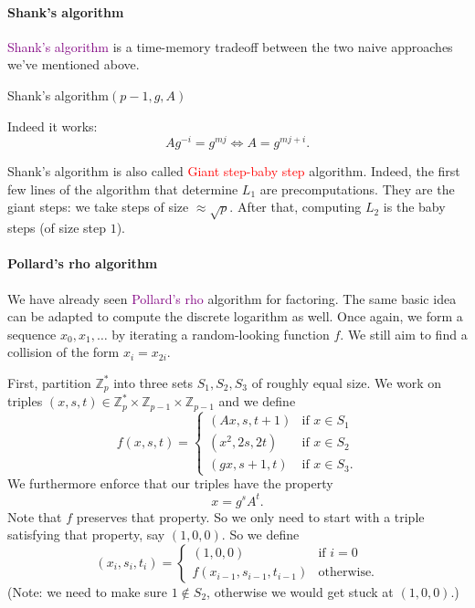 \documentclass[a4paper, 11pt, openany]{book}
\numberwithin{equation}{section}
\theoremstyle{plain}
\theoremstyle{definition}
\newcommand{\Z}{\mathbb{Z}}
\newcommand{\Important}[1]{\textcolor{red}{#1}}
\newcommand{\Define}[1]{\textcolor{purple}{#1}}
\begin{document}
\paragraph{Shank's algorithm}
\Define{Shank's algorithm} is a time-memory tradeoff between the two naive approaches we've mentioned above.

\begin{algorithm}[H]
\caption{Shank's algorithm$(p-1,g,A)$}
\begin{algorithmic}[1]
    \EndFor
    \EndFor
\end{algorithmic}
\end{algorithm}

Indeed it works:
\[
    Ag^{-i} = g^{mj} \iff A = g^{mj + i}.
\]


Shank's algorithm is also called \Important{Giant step-baby step} algorithm. Indeed, the first few lines of the algorithm that determine $L_1$ are precomputations. They are the giant steps: we take steps of size $\approx \sqrt{p}$. After that, computing $L_2$ is the baby steps (of size step $1$).

\paragraph{Pollard's rho algorithm}

We have already seen \Define{Pollard's rho} algorithm for factoring. The same basic idea can be adapted to compute the discrete logarithm as well. Once again, we form a sequence $x_0, x_1, \dots$ by iterating a random-looking function $f$. We still aim to find a collision of the form $x_i = x_{2i}$.

First, partition $\Z_p^*$ into three sets $S_1, S_2, S_3$ of roughly equal size. We work on triples $(x,s,t) \in \Z_p^* \times \Z_{p-1} \times \Z_{p-1}$ and we define
\[
    f(x, s, t) = \begin{cases}
    (Ax, s, t+1)    &\text{if } x \in S_1\\
    (x^2, 2s, 2t)   &\text{if } x \in S_2\\
    (gx, s+1, t)    &\text{if } x \in S_3.
    \end{cases}
\]
We furthermore enforce that our triples have the property
\[
    x = g^s A^t.
\]
Note that $f$ preserves that property. So we only need to start with a triple satisfying that property, say $(1,0,0)$. So we define
\[
    (x_i, s_i, t_i) = \begin{cases}
    (1,0,0) &\text{if } i=0\\
    f(x_{i-1}, s_{i-1} , t_{i-1}) &\text{otherwise.} 
    \end{cases}
\]
(Note: we need to make sure $1 \notin S_2$, otherwise we would get stuck at $(1,0,0)$.)
\end{document}
